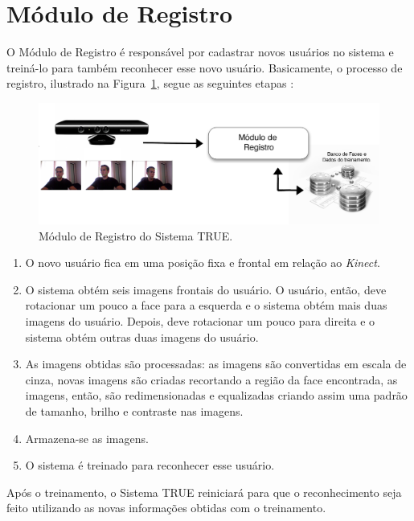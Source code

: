 \section{Módulo de Registro}

	O Módulo de Registro é responsável por cadastrar novos usuários no sistema e treiná-lo para também reconhecer esse novo usuário. Basicamente, o processo de registro, ilustrado na Figura~\ref{fig:registro}, segue as seguintes etapas :

		\begin{figure}[hbt]
			\begin{center}
				\includegraphics[scale=1.5]{figuras/4.ProblemaEProposta/registro.png}
			\end{center}
			\caption{Módulo de Registro do Sistema TRUE.}
			\label{fig:registro}
		\end{figure}		

		\begin{enumerate}
			\item O novo usuário fica em uma posição fixa e frontal em relação ao \textit{Kinect}. 
			\item O sistema obtém seis imagens frontais do usuário. O usuário, então, deve rotacionar um pouco a face para a esquerda e o sistema obtém mais duas imagens do usuário. Depois, deve rotacionar um pouco para direita e o sistema obtém outras duas imagens do usuário.
			\item As imagens obtidas são processadas: as imagens são convertidas em escala de cinza, novas imagens são criadas recortando a região da face encontrada, as imagens, então, são redimensionadas e equalizadas criando assim uma padrão de tamanho, brilho e contraste nas imagens.
			\item Armazena-se as imagens.
			\item O sistema é treinado para reconhecer esse usuário.
		\end{enumerate}

	Após o treinamento, o Sistema TRUE reiniciará para que o reconhecimento seja feito utilizando as novas informações obtidas com o treinamento.

